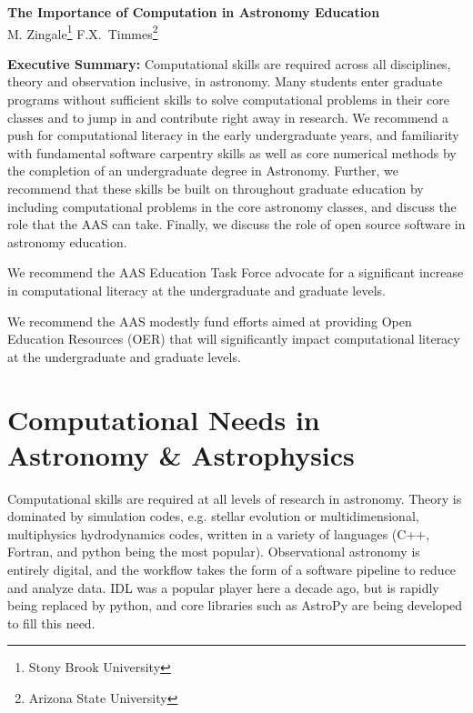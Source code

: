 \documentclass[11pt]{article}
\begin{document}
\thispagestyle{plain}

\begin{center}
{\Large \sffamily \bfseries The Importance of Computation in Astronomy Education} \\
{
M. Zingale\footnote{Stony Brook University}
F.X.~Timmes\footnote{Arizona State University}
}
\end{center}

\begin{tcolorbox}
{\sffamily \bfseries Executive Summary:} Computational skills are required
across all disciplines, theory and observation inclusive, in astronomy.
Many students enter graduate programs without sufficient skills
to solve computational problems in their core classes and to jump in and
contribute right away in research. We recommend a push for computational
literacy in the early undergraduate years, and familiarity with fundamental
software carpentry skills as well as core numerical methods by the
completion of an undergraduate degree in Astronomy.  Further, we recommend
that these skills be built on throughout graduate education by including
computational problems in the core astronomy classes, and discuss
the role that the AAS can take.  Finally, we discuss
the role of open source software in astronomy education.

\vspace {0.1in} We recommend the AAS Education Task Force advocate for
a significant increase in computational literacy at the undergraduate
and graduate levels.

\vspace {0.1in} We recommend the AAS modestly fund efforts aimed at
providing Open Education Resources (OER) that will significantly
impact computational literacy at the undergraduate and graduate
levels.


\end{tcolorbox}

\section{Computational Needs in Astronomy \& Astrophysics}

Computational skills are required at all levels of research in
astronomy.  Theory is dominated by simulation codes, e.g. stellar
evolution or multidimensional, multiphysics hydrodynamics codes,
written in a variety of languages (C++, Fortran, and python being the
most popular).  Observational astronomy is entirely digital, and the
workflow takes the form of a software pipeline to reduce and analyze
data.  IDL was a popular player here a decade ago, but is rapidly
being replaced by python, and core libraries such as AstroPy are being
developed to fill this need.
\end{document}

